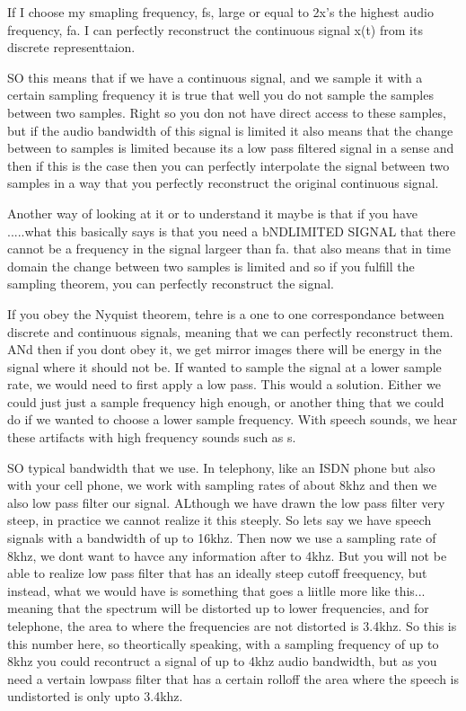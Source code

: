  If I choose my smapling frequency, fs, large or equal to 2x's the highest audio frequency, fa. I can perfectly reconstruct the continuous signal x(t) from its discrete representtaion.  
 
 SO this means that if we have a continuous signal, and we sample it with a certain sampling frequency it is true that well you do not sample the samples between two samples. Right so you don not have direct access to these samples, but if the audio bandwidth of this signal is limited it also means that the change between to samples is limited because its a low pass filtered signal in a sense and then if this is the case then you can perfectly interpolate the signal between two samples in a way that you perfectly reconstruct the original continuous signal.
 
 Another way of looking at it or to understand it maybe is that if you have .....what this basically says is that you need a bNDLIMITED SIGNAL that there cannot be a frequency in the signal largeer than fa. that also means that in time domain the change between two samples is limited and so if you fulfill the sampling theorem, you can perfectly reconstruct the signal.
 
 If you obey the Nyquist theorem, tehre is a one to one correspondance between discrete and continuous signals, meaning that we can perfectly reconstruct them.  ANd then if you dont obey it, we get mirror images there will be energy in the signal where it should not be.  If wanted to sample the signal at a lower sample rate, we would need to first apply a low pass.  This would a solution.  Either we could just just a sample frequency high enough, or another thing that we could do if we wanted to choose a lower sample frequency. With speech sounds, we hear these artifacts with high frequency sounds such as s.
 
 SO typical bandwidth that we use.  In telephony, like an ISDN phone but also with your cell phone, we work with sampling rates of about 8khz and then we also low pass filter our signal.  ALthough we have drawn the low pass filter very steep, in practice we cannot realize it this steeply.  So lets say we have speech signals with a bandwidth of up to 16khz.  Then now we use a sampling rate of 8khz, we dont want to havce any information after to 4khz.  But you will not be able to realize low pass filter that has an ideally steep cutoff freequency, but instead, what we would have is something that goes a liitlle more like this... meaning that the spectrum will be distorted up to lower frequencies, and for telephone, the area to where the frequencies are not distorted is 3.4khz. So this is this number here, so theortically speaking, with a sampling frequency of up to 8khz you could recontruct a signal of up to 4khz audio bandwidth, but as you need a vertain lowpass filter that has a certain rolloff the area where the speech is undistorted is only upto 3.4khz.
 
